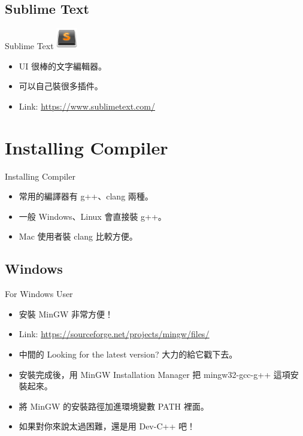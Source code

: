 \documentclass[t]{beamer}
\begin{document}
\subsection{Sublime Text}
\begin{frame}{Sublime Text}
  \vspace{0.5em}
  \hspace{2em}
  \includegraphics[height=2.5em]{image/st.png}
  \vspace{0.5em}
  \begin{itemize}
    \item UI 很棒的文字編輯器。
    \item 可以自己裝很多插件。
    \item Link: \href{https://www.sublimetext.com/}{\underline{https://www.sublimetext.com/}}
  \end{itemize}
\end{frame}

\section{Installing Compiler}
\begin{frame}{Installing Compiler}
  \begin{itemize}
    \item 常用的編譯器有 g++、clang 兩種。
    \item 一般 Windows、Linux 會直接裝 g++。
    \item Mac 使用者裝 clang 比較方便。
  \end{itemize}
\end{frame}

\subsection{Windows}
\begin{frame}{For Windows User}
  \begin{itemize}
    \item 安裝 MinGW 非常方便！
    \item Link: \href{https://sourceforge.net/projects/mingw/files/}{\underline{https://sourceforge.net/projects/mingw/files/}}
    \item 中間的 Looking for the latest version? 大力的給它戳下去。
    \item 安裝完成後，用 MinGW Installation Manager 把 mingw32-gcc-g++ 這項安裝起來。
    \item 將 MinGW 的安裝路徑加進環境變數 PATH 裡面。
    \item 如果對你來說太過困難，還是用 Dev-C++ 吧！
  \end{itemize}
\end{frame}
\end{document}
